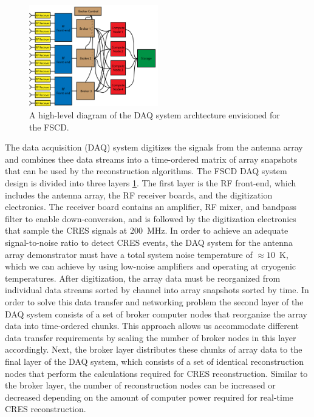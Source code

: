 \begin{figure}[htbp]
    \centering
    \includegraphics[width=0.5\textwidth]{figs/Chapter-4/230108_daq_system_overview.png}
    \caption{A high-level diagram of the DAQ system archtecture envisioned for the FSCD.}
    \label{fig:chap4-daq-system-overview}
\end{figure}

The data acquisition (DAQ) system digitizes the signals from the antenna array and combines thee data streams into a time-ordered matrix of array snapshots that can be used by the reconstruction algorithms. The FSCD DAQ system design \cite{p8daqIII} is divided into three layers \ref{fig:chap4-daq-system-overview}. The first layer is the RF front-end, which includes the antenna array, the RF receiver boards, and the digitization electronics. The receiver board contains an amplifier, RF mixer, and bandpass filter to enable down-conversion, and is followed by the digitization electronics that sample the CRES signals at 200~MHz. In order to achieve an adequate signal-to-noise ratio to detect CRES events, the DAQ system for the antenna array demonstrator must have a total system noise temperature of $\approx 10$~K, which we can achieve by using low-noise amplifiers and operating at cryogenic temperatures. After digitization, the array data must be reorganized from individual data streams sorted by channel into array snapshots sorted by time. In order to solve this data transfer and networking problem the second layer of the DAQ system consists of a set of broker computer nodes that reorganize the array data into time-ordered chunks. This approach allows us accommodate different data transfer requirements by scaling the number of broker nodes in this layer accordingly. Next, the broker layer distributes these chunks of array data to the final layer of the DAQ system, which consists of a set of identical reconstruction nodes that perform the calculations required for CRES reconstruction. Similar to the broker layer, the number of reconstruction nodes can be increased or decreased depending on the amount of computer power required for real-time CRES reconstruction.



